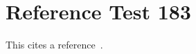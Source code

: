 \documentclass{article}
\begin{document}
\section{Reference Test 183}
This cites a reference~\cite{test183}.

\end{document}
